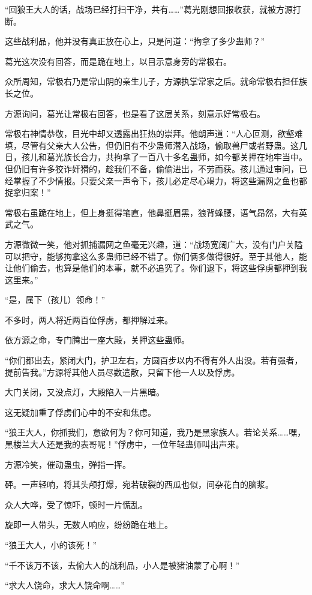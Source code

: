 \begin{this_body}
“回狼王大人的话，战场已经打扫干净，共有……”葛光刚想回报收获，就被方源打断。

这些战利品，他并没有真正放在心上，只是问道：“拘拿了多少蛊师？”

葛光这次没有回答，而是跪在地上，以目示意身旁的常极右。

众所周知，常极右乃是常山阴的亲生儿子，方源执掌常家之后。就命常极右担任族长之位。

方源询问，葛光让常极右回答，也是看了这层关系，刻意示好常极右。

常极右神情恭敬，目光中却又透露出狂热的崇拜。他朗声道：“人心叵测，欲壑难填，尽管有父亲大人公告，但仍旧有不少蛊师潜入战场，偷取兽尸或者野蛊。这几日，孩儿和葛光族长合力，共拘拿了一百八十多名蛊师，如今都关押在地牢当中。但仍旧有许多狡诈奸猾的，趁我们不备，偷偷进出，不劳而获。孩儿通过审问，已经掌握了不少情报。只要父亲一声令下，孩儿必定尽心竭力，将这些漏网之鱼也都捉拿归案！”

常极右虽跪在地上，但上身挺得笔直，他鼻挺眉黑，狼背蜂腰，语气昂然，大有英武之气。

方源微微一笑，他对抓捕漏网之鱼毫无兴趣，道：“战场宽阔广大，没有门户关隘可以把守，能够拘拿这么多蛊师已经不错了。你们俩多做得很好。至于其他人，能让他们偷去，也算是他们的本事，就不必追究了。你们退下，将这些俘虏都押到我这里来。”

“是，属下（孩儿）领命！”

不多时，两人将近两百位俘虏，都押解过来。

依方源之命，专门腾出一座大殿，关押这些蛊师。

“你们都出去，紧闭大门，护卫左右，方圆百步以内不得有外人出没。若有强者，提前告我。”方源将其他人员尽数遣散，只留下他一人以及俘虏。

大门关闭，又没点灯，大殿陷入一片黑暗。

这无疑加重了俘虏们心中的不安和焦虑。

“狼王大人，你抓我们，意欲何为？你可知道，我乃是黑家族人。若论关系……嘿，黑楼兰大人还是我的表哥呢！”俘虏中，一位年轻蛊师叫出声来。

方源冷笑，催动蛊虫，弹指一挥。

砰。一声轻响，将其头颅打爆，宛若破裂的西瓜也似，间杂花白的脑浆。

众人大哗，受了惊吓，顿时一片慌乱。

旋即一人带头，无数人响应，纷纷跪在地上。

“狼王大人，小的该死！”

“千不该万不该，去偷大人的战利品，小人是被猪油蒙了心啊！”

“求大人饶命，求大人饶命啊……”


\end{this_body}
